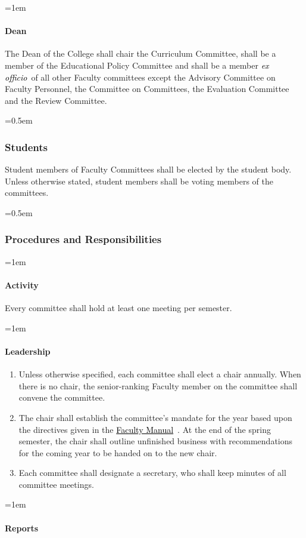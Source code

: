 \documentclass{manual}
\newcommand{\keyword}[1]{\textcolor{black}{#1}}
\newcommand{\facman}{\keyword{\underline{Faculty Manual}}~}
\newcommand{\exoff}{\keyword{\textit{ex officio}}~}
\let\oldsubsubsection\subsubsection
\renewcommand\subsubsection{\leftskip=0.5em\oldsubsubsection}
\let\oldparagraph\paragraph
\renewcommand\paragraph{\leftskip=1em\oldparagraph}
\newcommand{\itemLevelA}{\alph*.}
\newcommand{\itemRefA}{\alph*}
\begin{document}
			\paragraph{Dean}
			The Dean of the College shall chair the Curriculum Committee, shall be a member of the Educational Policy Committee and shall be a member \exoff of all other Faculty committees except the Advisory Committee on Faculty Personnel, the Committee on Committees, the Evaluation Committee and the Review Committee.

		\subsubsection{Students}
		Student members of Faculty Committees shall be elected by the student body. Unless otherwise stated, student members shall be voting members of the committees.

		\subsubsection{Procedures and Responsibilities}

			\paragraph{Activity}
			Every committee shall hold at least one meeting per semester.

			\paragraph{Leadership}

				\begin{enumerate}[label=\itemLevelA,ref=\itemRefA]
				\item Unless otherwise specified, each committee shall elect a chair annually. When there is no chair, the senior-ranking Faculty member on the committee shall convene the committee.
				\item The chair shall establish the committee's mandate for the year based upon the directives given in the \facman. At the end of the spring semester, the chair shall outline unfinished business with recommendations for the coming year to be handed on to the new chair.
				\item Each committee shall designate a secretary, who shall keep minutes of all committee meetings.
				\end{enumerate}

			\paragraph{Reports}
\end{document}
